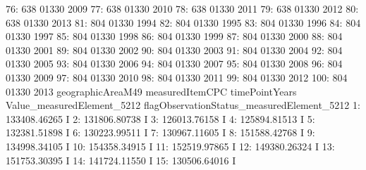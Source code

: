 \documentclass[nojss]{jss}
\begin{document}
\begin{Schunk}
\begin{Soutput}
 76:               638           01330           2009
 77:               638           01330           2010
 78:               638           01330           2011
 79:               638           01330           2012
 80:               638           01330           2013
 81:               804           01330           1994
 82:               804           01330           1995
 83:               804           01330           1996
 84:               804           01330           1997
 85:               804           01330           1998
 86:               804           01330           1999
 87:               804           01330           2000
 88:               804           01330           2001
 89:               804           01330           2002
 90:               804           01330           2003
 91:               804           01330           2004
 92:               804           01330           2005
 93:               804           01330           2006
 94:               804           01330           2007
 95:               804           01330           2008
 96:               804           01330           2009
 97:               804           01330           2010
 98:               804           01330           2011
 99:               804           01330           2012
100:               804           01330           2013
     geographicAreaM49 measuredItemCPC timePointYears
     Value_measuredElement_5212 flagObservationStatus_measuredElement_5212
  1:               133408.46265                                          I
  2:               131806.80738                                          I
  3:               126013.76158                                          I
  4:               125894.81513                                          I
  5:               132381.51898                                          I
  6:               130223.99511                                          I
  7:               130967.11605                                          I
  8:               151588.42768                                          I
  9:               134998.34105                                          I
 10:               154358.34915                                          I
 11:               152519.97865                                          I
 12:               149380.26324                                          I
 13:               151753.30395                                          I
 14:               141724.11550                                          I
 15:               130506.64016                                          I

\end{Soutput}
\end{Schunk}
\end{document}
